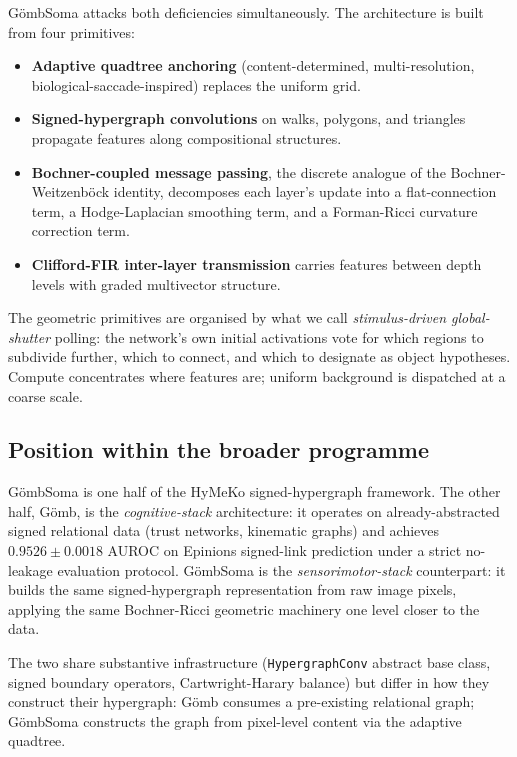 \documentclass[11pt,a4paper]{article}
\newcommand{\GS}{G\"ombSoma}
\newcommand{\Gomb}{G\"omb}
\begin{document}
\GS{} attacks both deficiencies simultaneously. The architecture
is built from four primitives:

\begin{itemize}
\item \textbf{Adaptive quadtree anchoring} (content-determined,
  multi-resolution, biological-saccade-inspired) replaces the
  uniform grid.
\item \textbf{Signed-hypergraph convolutions} on walks, polygons,
  and triangles propagate features along compositional structures.
\item \textbf{Bochner-coupled message passing}, the discrete
  analogue of the Bochner-Weitzenböck identity, decomposes each
  layer's update into a flat-connection term, a Hodge-Laplacian
  smoothing term, and a Forman-Ricci curvature correction term.
\item \textbf{Clifford-FIR inter-layer transmission} carries
  features between depth levels with graded multivector structure.
\end{itemize}

The geometric primitives are organised by what we call
\emph{stimulus-driven global-shutter} polling: the network's own
initial activations vote for which regions to subdivide further,
which to connect, and which to designate as object hypotheses.
Compute concentrates where features are; uniform background is
dispatched at a coarse scale.

\subsection{Position within the broader programme}

\GS{} is one half of the HyMeKo signed-hypergraph framework. The
other half, \Gomb, is the \emph{cognitive-stack} architecture: it
operates on already-abstracted signed relational data (trust
networks, kinematic graphs) and achieves $0.9526 \pm 0.0018$ AUROC
on Epinions signed-link prediction under a strict no-leakage
evaluation protocol. \GS{} is the \emph{sensorimotor-stack}
counterpart: it builds the same signed-hypergraph representation
from raw image pixels, applying the same Bochner-Ricci geometric
machinery one level closer to the data.

The two share substantive infrastructure (\texttt{HypergraphConv}
abstract base class, signed boundary operators, Cartwright-Harary
balance) but differ in how they construct their hypergraph: \Gomb{}
consumes a pre-existing relational graph; \GS{} constructs the
graph from pixel-level content via the adaptive quadtree.
\end{document}
